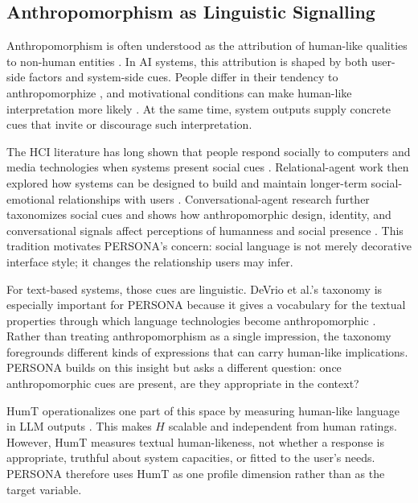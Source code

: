 \documentclass[manuscript,review,anonymous]{acmart}
\begin{document}
\subsection{Anthropomorphism as Linguistic Signalling}
Anthropomorphism is often understood as the attribution of human-like qualities to non-human entities \cite{Epley2007Anthropomorphism}. In AI systems, this attribution is shaped by both user-side factors and system-side cues. People differ in their tendency to anthropomorphize \cite{Waytz2010WhoSeesHuman}, and motivational conditions can make human-like interpretation more likely \cite{Epley2008NeedHuman}. At the same time, system outputs supply concrete cues that invite or discourage such interpretation.

The HCI literature has long shown that people respond socially to computers and media technologies when systems present social cues \cite{Nass1994CASA,Reeves1996MediaEquation,NassMoon2000Mindlessness}. Relational-agent work then explored how systems can be designed to build and maintain longer-term social-emotional relationships with users \cite{Bickmore2005RelationalAgents}. Conversational-agent research further taxonomizes social cues and shows how anthropomorphic design, identity, and conversational signals affect perceptions of humanness and social presence \cite{Feine2019SocialCues,Araujo2018ChatbotHype,GoSundar2019Humanizing}. This tradition motivates PERSONA's concern: social language is not merely decorative interface style; it changes the relationship users may infer.

For text-based systems, those cues are linguistic. DeVrio et al.'s taxonomy is especially important for PERSONA because it gives a vocabulary for the textual properties through which language technologies become anthropomorphic \cite{DeVrio2025Taxonomy}. Rather than treating anthropomorphism as a single impression, the taxonomy foregrounds different kinds of expressions that can carry human-like implications. PERSONA builds on this insight but asks a different question: once anthropomorphic cues are present, are they appropriate in the context?

HumT operationalizes one part of this space by measuring human-like language in LLM outputs \cite{Cheng2025HumT}. This makes $H$ scalable and independent from human ratings. However, HumT measures textual human-likeness, not whether a response is appropriate, truthful about system capacities, or fitted to the user's needs. PERSONA therefore uses HumT as one profile dimension rather than as the target variable.
\end{document}

